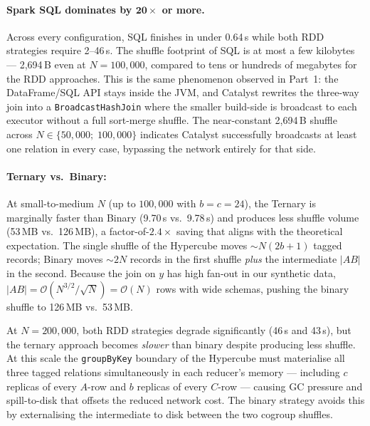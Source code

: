 \documentclass[11pt,a4paper]{article}
\begin{document}
\paragraph{Spark SQL dominates by $\mathbf{20\times}$ or more.}
Across every configuration, SQL finishes in under 0.64\,s while both RDD strategies require 2–46\,s. The shuffle footprint of SQL is at most a few kilobytes — 2,694\,B even at $N = 100{,}000$, compared to tens or hundreds of megabytes for the RDD approaches. This is the same phenomenon observed in Part~1: the DataFrame/SQL API stays inside the JVM, and Catalyst rewrites the three-way join into a \texttt{BroadcastHashJoin} where the smaller build-side is broadcast to each executor without a full sort-merge shuffle. The near-constant 2,694\,B shuffle across $N \in \{50{,}000;\; 100{,}000\}$ indicates Catalyst successfully broadcasts at least one relation in every case, bypassing the network entirely for that side.

\paragraph{Ternary vs.\ Binary:}
At small-to-medium $N$ (up to $100{,}000$ with $b = c = 24$), the Ternary is marginally faster than Binary (9.70\,s vs.\ 9.78\,s) and produces less shuffle volume (53\,MB vs.\ 126\,MB), a factor-of-$2.4\times$ saving that aligns with the theoretical expectation. The single shuffle of the Hypercube moves $\sim N(2b+1)$ tagged records; Binary moves $\sim 2N$ records in the first shuffle \emph{plus} the intermediate $|AB|$ in the second. Because the join on $y$ has high fan-out in our synthetic data, $|AB| = \mathcal{O}(N^{3/2}/\sqrt{N}) = \mathcal{O}(N)$ rows with wide schemas, pushing the binary shuffle to 126\,MB vs.\ 53\,MB.

At $N = 200{,}000$, both RDD strategies degrade significantly (46\,s and 43\,s), but the ternary approach becomes \emph{slower} than binary despite producing less shuffle. At this scale the \texttt{groupByKey} boundary of the Hypercube must materialise all three tagged relations simultaneously in each reducer's memory — including $c$ replicas of every $A$-row and $b$ replicas of every $C$-row — causing GC pressure and spill-to-disk that offsets the reduced network cost. The binary strategy avoids this by externalising the intermediate to disk between the two cogroup shuffles.
\end{document}
